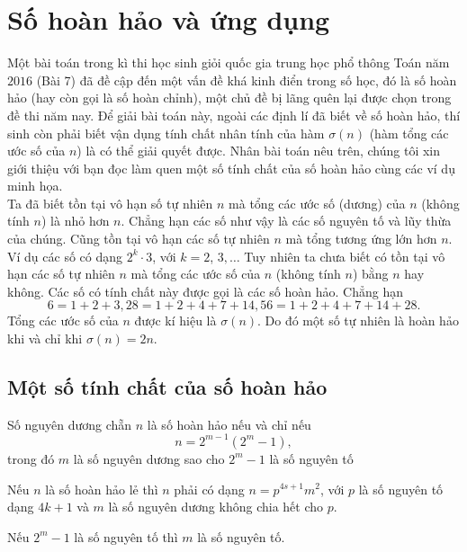 \section{Số hoàn hảo và ứng dụng}
\begin{center}\textbf{\color{violet}{Nguyễn Cửu Huy, Nguyễn Đình Minh-Trường THPT Chuyên Lê Quý Đôn Đà Nẵng}}\end{center}
\noindent Một bài toán trong kì thi học sinh giỏi quốc gia trung học phổ thông Toán năm $2016$ (Bài 7) đã đề cập đến một vấn đề khá kinh điển trong số học, đó là số hoàn hảo (hay còn gọi là số hoàn chỉnh), một chủ đề bị lãng quên lại được chọn trong đề thi năm nay. Để giải bài toán này, ngoài các định lí đã biết về số hoàn hảo, thí sinh còn phải biết vận dụng tính chất nhân tính của hàm $\sigma (n)$ (hàm tổng các ước số của $n$) là có thể giải quyết được. Nhân bài toán nêu trên, chúng tôi xin giới thiệu với bạn đọc làm quen một số tính chất của số hoàn hảo cùng các ví dụ minh họa.\\
Ta đã biết tồn tại vô hạn số tự nhiên $n$ mà tổng các ước số (dương) của $n$ (không tính $n$) là nhỏ hơn $n$. Chẳng hạn các số như vậy là các số nguyên tố và lũy thừa của chúng. Cũng tồn tại vô hạn các số tự nhiên $n$ mà tổng tương ứng lớn hơn $n$. Ví dụ các số có dạng $2^k\cdot 3$, với $k=2$, $3,\ldots$ Tuy nhiên ta chưa biết có tồn tại vô hạn các số tự nhiên $n$ mà tổng các ước số của $n$ (không tính $n$) bằng $n$ hay không. Các số có tính chất này được gọi là các số hoàn hảo. Chẳng hạn
$$6=1+2+3, 28=1+2+4+7+14, 56=1+2+4+7+14+28.$$
Tổng các ước số của $n$ được kí hiệu là $\sigma (n)$. Do đó một số tự nhiên là hoàn hảo  khi và chỉ khi $\sigma (n) = 2n$.

\subsection{Một số tính chất của số hoàn hảo}

\begin{dl}
Số nguyên dương chẵn $n$ là số hoàn hảo nếu và chỉ nếu $$n=2^{m-1}(2^m-1),$$
trong đó $m$ là số nguyên dương sao cho $2^m-1$ là số nguyên tố
\end{dl}

\begin{dl}[Euler]
Nếu $n$ là số hoàn hảo lẻ thì $n$ phải có dạng $n=p^{4s+1}m^2$, với $p$ là số nguyên tố dạng $4k+1$ và $m$ là số nguyên dương không chia hết cho $p$.
\end{dl}
\begin{dl}
	Nếu $2^m-1$ là số nguyên tố thì $m$ là số nguyên tố.
\end{dl}

